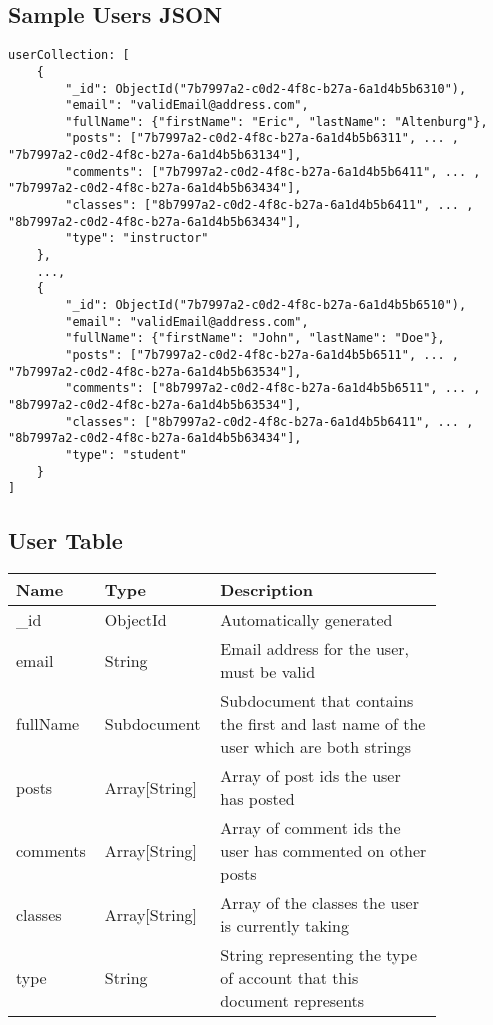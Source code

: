 \documentclass[preprint,11pt,3p]{article}
\begin{document}
\subsection{Sample Users JSON}
\begin{lstlisting}
userCollection: [
	{
		"_id": ObjectId("7b7997a2-c0d2-4f8c-b27a-6a1d4b5b6310"),
		"email": "validEmail@address.com",
		"fullName": {"firstName": "Eric", "lastName": "Altenburg"},
		"posts": ["7b7997a2-c0d2-4f8c-b27a-6a1d4b5b6311", ... , "7b7997a2-c0d2-4f8c-b27a-6a1d4b5b63134"],
		"comments": ["7b7997a2-c0d2-4f8c-b27a-6a1d4b5b6411", ... , "7b7997a2-c0d2-4f8c-b27a-6a1d4b5b63434"],
		"classes": ["8b7997a2-c0d2-4f8c-b27a-6a1d4b5b6411", ... , "8b7997a2-c0d2-4f8c-b27a-6a1d4b5b63434"],
		"type": "instructor"
	},
	...,
	{
		"_id": ObjectId("7b7997a2-c0d2-4f8c-b27a-6a1d4b5b6510"),
		"email": "validEmail@address.com",
		"fullName": {"firstName": "John", "lastName": "Doe"},
		"posts": ["7b7997a2-c0d2-4f8c-b27a-6a1d4b5b6511", ... , "7b7997a2-c0d2-4f8c-b27a-6a1d4b5b63534"],
		"comments": ["8b7997a2-c0d2-4f8c-b27a-6a1d4b5b6511", ... , "8b7997a2-c0d2-4f8c-b27a-6a1d4b5b63534"],
		"classes": ["8b7997a2-c0d2-4f8c-b27a-6a1d4b5b6411", ... , "8b7997a2-c0d2-4f8c-b27a-6a1d4b5b63434"],
		"type": "student"
	}
]
\end{lstlisting}

\subsection{User Table}
\begingroup
\setlength{\tabcolsep}{15pt} %
\renewcommand{\arraystretch}{1.5} %
\begin{tabular}{| p{0.15\linewidth} | p{0.20\linewidth} | p{0.5\linewidth} |}
	\hline
	\textbf{Name} & \textbf{Type} & \textbf{Description} \\
	\hline
	_id & ObjectId & Automatically generated\\
	\hline
	email & String & Email address for the user, must be valid\\
	\hline
	fullName & Subdocument & Subdocument that contains the first and last name of the user which are both strings\\
	\hline
	posts & Array[String] & Array of post ids the user has posted\\
	\hline
	comments & Array[String] & Array of comment ids the user has commented on other posts\\
	\hline
	classes & Array[String] & Array of the classes the user is currently taking\\
	\hline
	type & String & String representing the type of account that this document represents\\
	\hline
\end{tabular}
\endgroup
\end{document}
